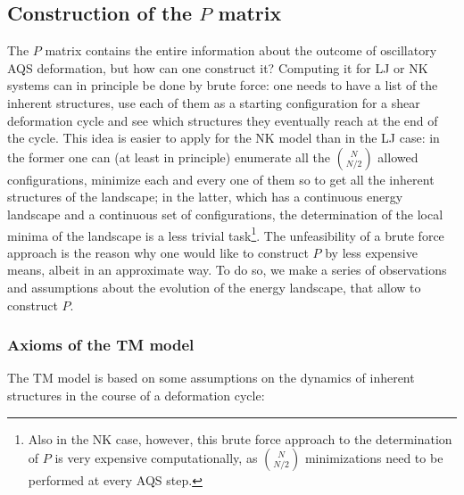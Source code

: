\subsection{Construction of the $P$ matrix}
The $P$ matrix contains the entire information about the outcome of oscillatory AQS deformation, but how can one construct it?
Computing it for LJ or NK systems can in principle be done by brute force: one needs to have a list of the inherent structures, use each of them as a starting configuration for a shear deformation cycle and see which structures they eventually reach at the end of the cycle. This idea is easier to apply for the NK model than in the LJ case: in the former one can (at least in principle) enumerate all the $\binom{N}{N/2}$ allowed configurations, minimize each and every one of them so to get all the inherent structures of the landscape; in the latter, which has a continuous energy landscape and a continuous set of configurations, the determination of the local minima of the landscape is a less trivial task\footnote{Also in the NK case, however, this brute force approach to the determination of $P$ is very expensive computationally, as $\binom{N}{N/2}$ minimizations need to be performed at every AQS step.}. 
The unfeasibility of a brute force approach is the reason why one would like to construct $P$ by less expensive means, albeit in an approximate way. To do so, we make a series of observations and assumptions about the evolution of the energy landscape, that allow to construct $P$.

\subsubsection{Axioms of the TM model \label{sec:TMAssumptions}}

The TM model is based on some assumptions on the dynamics of inherent structures in the course of a deformation cycle:

